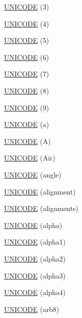 \begin{DoxyCompactItemize}
\item 
\hyperlink{namespace_d_d4hep_1_1_x_m_l_a6585bb1bddfc87d5b6922f8378eae3d4}{UNICODE} (3)
\item 
\hyperlink{namespace_d_d4hep_1_1_x_m_l_a1990be78ed2696089312b3cd52bc4dd4}{UNICODE} (4)
\item 
\hyperlink{namespace_d_d4hep_1_1_x_m_l_aa8f833eda6fb5edc3992b3109fc1b145}{UNICODE} (5)
\item 
\hyperlink{namespace_d_d4hep_1_1_x_m_l_af3571205d99e9d532fe59a9f7e19cf57}{UNICODE} (6)
\item 
\hyperlink{namespace_d_d4hep_1_1_x_m_l_a430f87ed011c9770e7d86864400da3da}{UNICODE} (7)
\item 
\hyperlink{namespace_d_d4hep_1_1_x_m_l_a3347b57d8b9725a7217c6abdd0308e71}{UNICODE} (8)
\item 
\hyperlink{namespace_d_d4hep_1_1_x_m_l_ae550de39cafa7593714714ca943f1858}{UNICODE} (9)
\item 
\hyperlink{namespace_d_d4hep_1_1_x_m_l_a553ed9b509e8bd593926ce6484ecdd05}{UNICODE} (a)
\item 
\hyperlink{namespace_d_d4hep_1_1_x_m_l_a20b3d3faff6f8f430e3e5c48caa5d3db}{UNICODE} (A)
\item 
\hyperlink{namespace_d_d4hep_1_1_x_m_l_ab9b807e7f300a5d5324987d2cca9d263}{UNICODE} (Air)
\item 
\hyperlink{namespace_d_d4hep_1_1_x_m_l_a22a6c19b702f13e58f4a63a727d32849}{UNICODE} (angle)
\item 
\hyperlink{namespace_d_d4hep_1_1_x_m_l_a52168ebcf9545281b946c598ad4180ee}{UNICODE} (alignment)
\item 
\hyperlink{namespace_d_d4hep_1_1_x_m_l_aac909b2858fd820598354e815fd279c2}{UNICODE} (alignments)
\item 
\hyperlink{namespace_d_d4hep_1_1_x_m_l_abf34ee32f0539390de87a55bcbe2e4c4}{UNICODE} (alpha)
\item 
\hyperlink{namespace_d_d4hep_1_1_x_m_l_a46c200f593aae803a62c13a83caa68b1}{UNICODE} (alpha1)
\item 
\hyperlink{namespace_d_d4hep_1_1_x_m_l_affcc9652d1dbabc8c0b5a16d35bbdacd}{UNICODE} (alpha2)
\item 
\hyperlink{namespace_d_d4hep_1_1_x_m_l_a04ceb3c6699839d48a368368fccc7750}{UNICODE} (alpha3)
\item 
\hyperlink{namespace_d_d4hep_1_1_x_m_l_a55510c7bcf274d9165301c7608b8e00e}{UNICODE} (alpha4)
\item 
\hyperlink{namespace_d_d4hep_1_1_x_m_l_a74f70cb05e26ef0264f4412a7c947b7b}{UNICODE} (arb8)
\item 

\end{DoxyCompactItemize}
